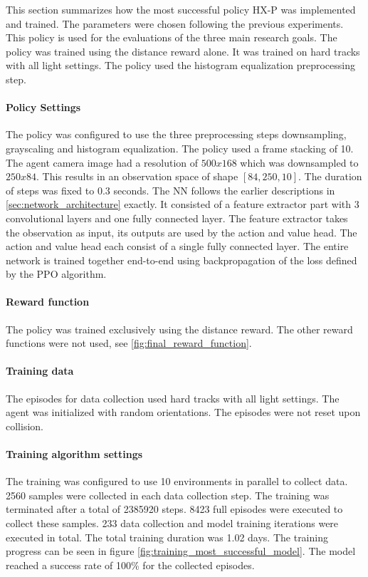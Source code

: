 This section summarizes how the most successful policy \ac{HX-P} was implemented and trained. The parameters were chosen following the previous experiments. This policy is used for the evaluations of the three main research goals.
The policy was trained using the distance reward alone. It was trained on hard tracks with all light settings. The policy used the histogram equalization preprocessing step.

\paragraph{Policy Settings}
The policy was configured to use the three preprocessing steps downsampling, grayscaling and histogram equalization. The policy used a frame stacking of 10. The agent camera image had a resolution of $500x168$ which was downsampled to $250x84$. This results in an observation space of shape $[84, 250, 10]$. The duration of steps was fixed to $0.3$ seconds.
The \ac{NN} follows the earlier descriptions in \ref{sec:network_architecture} exactly. It consisted of a feature extractor part with 3 convolutional layers and one fully connected layer. The feature extractor takes the observation as input, its outputs are used by the action and value head. The action and value head each consist of a single fully connected layer. The entire network is trained together end-to-end using backpropagation of the loss defined by the \ac{PPO} algorithm.

\paragraph{Reward function}
The policy was trained exclusively using the distance reward. The other reward functions were not used, see \ref{fig:final_reward_function}.

\paragraph{Training data}
The episodes for data collection used hard tracks with all light settings. The agent was initialized with random orientations. The episodes were not reset upon collision.

\paragraph{Training algorithm settings}
The training was configured to use 10 environments in parallel to collect data. 2560 samples were collected in each data collection step. The training was terminated after a total of 2385920 steps. 8423 full episodes were executed to collect these samples. 233 data collection and model training iterations were executed in total. The total training duration was 1.02 days.
The training progress can be seen in figure \ref{fig:training_most_successful_model}. The model reached a success rate of 100\% for the collected episodes.

